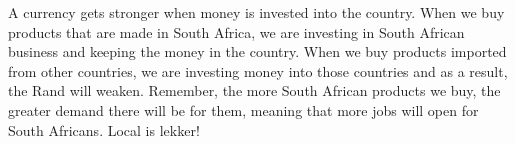 A currency gets stronger when money is invested into the country. When we buy products that are made in South Africa, we are investing in South African business and keeping the money in the country. When we buy products imported from other countries, we are investing money into those countries and as a result, the Rand will weaken. Remember, the more South African products we buy, the greater demand there will be for them, meaning that more jobs will open for South Africans. Local is lekker!


\begin{wex}{Foreign Exchange Rates}
    {Saba wants to travel to see family in Spain. She has been given R~$10~000$ spending money. How many Euros can she buy if the exchange rate is currently €~$1$ = R~$10,68$?}{
    
    Saba can buy €~$936,33$ with R~$10~000$.
\end{wex}


